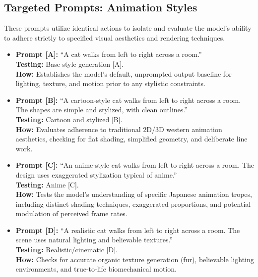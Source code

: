 \documentclass[sigconf]{acmart}
\begin{document}
\subsection{Targeted Prompts: Animation Styles}
These prompts utilize identical actions to isolate and evaluate the model's ability to adhere strictly to specified visual aesthetics and rendering techniques.

\begin{itemize}
    \item \textbf{Prompt [A]:} ``A cat walks from left to right across a room.''
          \\ \textbf{Testing:} Base style generation [A].
          \\ \textbf{How:} Establishes the model's default, unprompted output baseline for lighting, texture, and motion prior to any stylistic constraints.

    \item \textbf{Prompt [B]:} ``A cartoon-style cat walks from left to right across a room. The shapes are simple and stylized, with clean outlines.''
          \\ \textbf{Testing:} Cartoon and stylized [B].
          \\ \textbf{How:} Evaluates adherence to traditional 2D/3D western animation aesthetics, checking for flat shading, simplified geometry, and deliberate line work.



    \item \textbf{Prompt [C]:} ``An anime-style cat walks from left to right across a room. The design uses exaggerated stylization typical of anime.''
          \\ \textbf{Testing:} Anime [C].
          \\ \textbf{How:} Tests the model's understanding of specific Japanese animation tropes, including distinct shading techniques, exaggerated proportions, and potential modulation of perceived frame rates.

    \item \textbf{Prompt [D]:} ``A realistic cat walks from left to right across a room. The scene uses natural lighting and believable textures.''
          \\ \textbf{Testing:} Realistic/cinematic [D].
          \\ \textbf{How:} Checks for accurate organic texture generation (fur), believable lighting environments, and true-to-life biomechanical motion.


\end{itemize}
\end{document}
